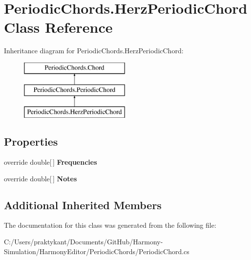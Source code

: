 \hypertarget{class_periodic_chords_1_1_herz_periodic_chord}{\section{Periodic\+Chords.\+Herz\+Periodic\+Chord Class Reference}
\label{class_periodic_chords_1_1_herz_periodic_chord}
}
Inheritance diagram for Periodic\+Chords.\+Herz\+Periodic\+Chord\+:\begin{figure}[H]
\begin{center}
\leavevmode
\includegraphics[height=3.000000cm]{class_periodic_chords_1_1_herz_periodic_chord}
\end{center}
\end{figure}
\subsection*{Properties}
\begin{DoxyCompactItemize}
\item 
\hypertarget{class_periodic_chords_1_1_herz_periodic_chord_a0af7958a9c11aaa08e607af318c72b34}{override double\mbox{[}$\,$\mbox{]} {\bfseries Frequencies}}\label{class_periodic_chords_1_1_herz_periodic_chord_a0af7958a9c11aaa08e607af318c72b34}

\item 
\hypertarget{class_periodic_chords_1_1_herz_periodic_chord_acab810914d959ee196a210e5e4a34383}{override double\mbox{[}$\,$\mbox{]} {\bfseries Notes}}\label{class_periodic_chords_1_1_herz_periodic_chord_acab810914d959ee196a210e5e4a34383}

\end{DoxyCompactItemize}
\subsection*{Additional Inherited Members}


The documentation for this class was generated from the following file\+:\begin{DoxyCompactItemize}
\item 
C\+:/\+Users/praktykant/\+Documents/\+Git\+Hub/\+Harmony-\/\+Simulation/\+Harmony\+Editor/\+Periodic\+Chords/Periodic\+Chord.\+cs\end{DoxyCompactItemize}
